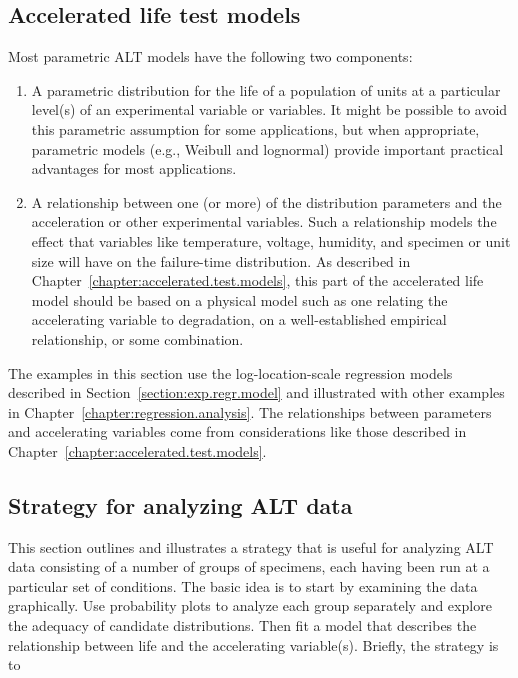\subsection{Accelerated life test models}
Most parametric ALT models have the following two components:
\begin{enumerate}
\item
A parametric distribution for the life of a population of units at a
particular level(s) of an experimental variable or variables.  It
might be possible to avoid this parametric assumption for some
applications, but when appropriate, parametric models (e.g., Weibull
and lognormal) provide important practical advantages for most
applications.

\item
A relationship between one (or more) of the distribution parameters
and the acceleration or other experimental variables. Such a
relationship models the effect that variables like temperature,
voltage, humidity, and specimen or unit size will have on the
failure-time distribution.  As described in
Chapter~\ref{chapter:accelerated.test.models}, this part of the
accelerated life model should be based on a physical model such as
one relating the accelerating variable to degradation, on a
well-established empirical relationship, or some combination.
\end{enumerate}

The examples in this section use the log-location-scale regression
models described in Section~\ref{section:exp.regr.model} and
illustrated with other examples in
Chapter~\ref{chapter:regression.analysis}. The relationships between
parameters and accelerating variables come from considerations like
those described in Chapter~\ref{chapter:accelerated.test.models}.

\subsection{Strategy for analyzing ALT data}
\label{section:alt.strategy}
This section outlines and illustrates a strategy that is useful for
analyzing ALT data consisting of a number of groups of specimens,
each having been run at a particular set of conditions. The basic
idea is to start by examining the data graphically. Use probability
plots to analyze each group separately and explore the adequacy of
candidate distributions. Then fit a model that describes the
relationship between life and the accelerating variable(s).
Briefly, the strategy is to

